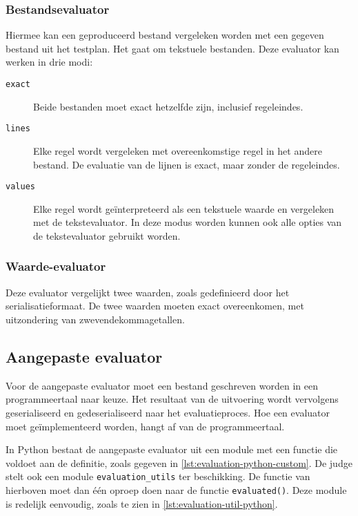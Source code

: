\subsubsection{Bestandsevaluator}

Hiermee kan een geproduceerd bestand vergeleken worden met een gegeven bestand uit het testplan.
Het gaat om tekstuele bestanden.
Deze evaluator kan werken in drie modi:

\begin{description}
    \item[\texttt{exact}] Beide bestanden moet exact hetzelfde zijn, inclusief regeleindes.
    \item[\texttt{lines}] Elke regel wordt vergeleken met overeenkomstige regel in het andere bestand.
    De evaluatie van de lijnen is exact, maar zonder de regeleindes.
    \item[\texttt{values}] Elke regel wordt geïnterpreteerd als een tekstuele waarde en vergeleken met de tekstevaluator.
    In deze modus worden kunnen ook alle opties van de tekstevaluator gebruikt worden.
\end{description}

\subsubsection{Waarde-evaluator}

Deze evaluator vergelijkt twee waarden, zoals gedefinieerd door het serialisatieformaat.
De twee waarden moeten exact overeenkomen, met uitzondering van zwevendekommagetallen.


\subsection{Aangepaste evaluator}\label{subsec:aangepaste-evaluator}

Voor de aangepaste evaluator moet een bestand geschreven worden in een programmeertaal naar keuze.
Het resultaat van de uitvoering wordt vervolgens geserialiseerd en gedeserialiseerd naar het evaluatieproces.
Hoe een evaluator moet geïmplementeerd worden, hangt af van de programmeertaal.

In Python bestaat de aangepaste evaluator uit een module met een functie die voldoet aan de definitie, zoals gegeven in \cref{lst:evaluation-python-custom}.
De judge stelt ook een module \texttt{evaluation\_utils} ter beschikking.
De functie van hierboven moet dan één oproep doen naar de functie \texttt{evaluated()}.
Deze module is redelijk eenvoudig, zoals te zien in \cref{lst:evaluation-util-python}.

